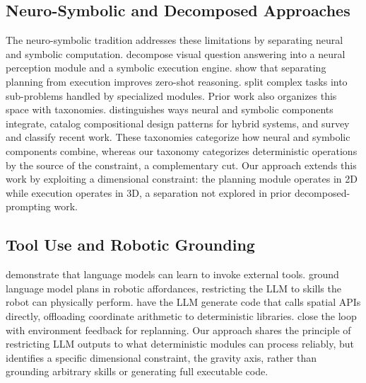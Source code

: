 \documentclass[10pt]{article}
\begin{document}
\subsection{Neuro-Symbolic and Decomposed Approaches}
The neuro-symbolic tradition addresses these limitations by separating
neural and symbolic computation. \textcite{yi2018} decompose visual
question answering into a neural perception module and a symbolic
execution engine. \textcite{wang2023} show that separating planning from
execution improves zero-shot reasoning. \textcite{khot2023} split complex
tasks into sub-problems handled by specialized modules. Prior work also
organizes this space with taxonomies. \textcite{kautz2022} distinguishes
ways neural and symbolic components integrate, \textcite{vanharmelen2019}
catalog compositional design patterns for hybrid systems, and
\textcite{sarker2021} survey and classify recent work. These taxonomies
categorize how neural and symbolic components combine, whereas our taxonomy
categorizes deterministic operations by the source of the constraint, a
complementary cut. Our approach
extends this work by exploiting a dimensional constraint: the planning
module operates in 2D while execution operates in 3D, a separation not
explored in prior decomposed-prompting work.

\subsection{Tool Use and Robotic Grounding}
\textcite{schick2023} demonstrate that language models can learn to invoke
external tools. \textcite{saycan2022} ground language model plans in
robotic affordances, restricting the LLM to skills the robot can
physically perform. \textcite{cap2022} have the LLM generate code that
calls spatial APIs directly, offloading coordinate arithmetic to
deterministic libraries. \textcite{innermonologue2022} close the loop
with environment feedback for replanning. Our approach shares the
principle of restricting LLM outputs to what deterministic modules can
process reliably, but identifies a specific dimensional constraint, the
gravity axis, rather than grounding arbitrary skills or generating full
executable code.
\end{document}
